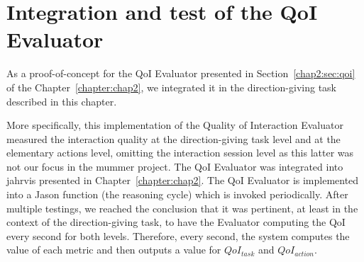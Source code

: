 \documentclass[a4paper,11pt,twoside]{StyleThese}
\begin{document}
\section{Integration and test of the QoI Evaluator}\label{sec:qoi_integration}
As a proof-of-concept for the QoI Evaluator presented in Section~\ref{chap2:sec:qoi} of the Chapter~\ref{chapter:chap2}, we integrated it in the direction-giving task described in this chapter.


More specifically, this implementation of the Quality of Interaction Evaluator measured the interaction quality at the direction-giving task level and at the elementary actions level, omitting the interaction session level as this latter was not our focus in the \acrshort{mummer} project. The QoI Evaluator was integrated into \acrshort{jahrvis} presented in Chapter~\ref{chapter:chap2}. The QoI Evaluator is implemented into a Jason function (the reasoning cycle) which is invoked periodically. After multiple testings, we reached the conclusion that it was pertinent, at least in the context of the direction-giving task, to have the Evaluator computing the QoI every second for both levels. Therefore, every second, the system computes the value of each metric and then outputs a value for $QoI_{task}$ and $QoI_{action}$. 
\end{document}
